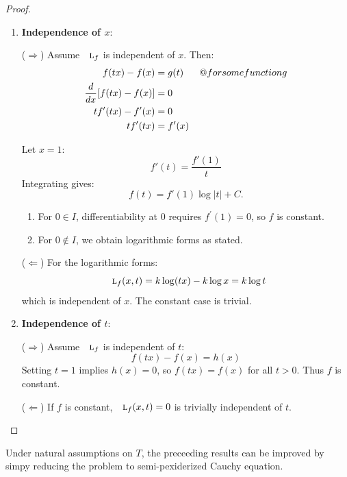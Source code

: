 \documentclass{amsart}
\makeatletter
\theoremstyle{plain}
\numberwithin{equation}{section}
\def\RIfM@{\relax\ifmmode}%
\def\RIfM@{\relax\protect\ifmmode}
\def\text{\RIfM@\expandafter\text@\else\expandafter\mbox\fi}
\def\text@#1{\mathchoice
   {\textdef@\displaystyle\f@size{#1}}%
   {\textdef@\textstyle\tf@size{\firstchoice@false #1}}%
   {\textdef@\textstyle\sf@size{\firstchoice@false #1}}%
   {\textdef@\textstyle \ssf@size{\firstchoice@false #1}}%
   \glb@settings}
\def\textdef@#1#2#3{\hbox{{%
                    \everymath{#1}%
                    \let\f@size#2\selectfont
                    #3}}}
\newif\iffirstchoice@
\makeatother
\begin{document}
\begin{proof}
\begin{enumerate}
    \item \textbf{Independence of $x$}:
    
    ($\Rightarrow$) Assume $\textsc{l}_f$ is independent of $x$. Then:
    \begin{align*}
        f(tx) - f(x) &= g(t) \quad \text{for some function } g \\
        \frac{d}{dx}[f(tx) - f(x)] &= 0 \\
        tf'(tx) - f'(x) &= 0 \\
        tf'(tx) &= f'(x)
    \end{align*}
    
    Let $x = 1$:
    \[
    f'(t) = \frac{f'(1)}{t}
    \]
    Integrating gives:
    \[
    f(t) = f'(1)\log|t| + C.
    \]
    
    \begin{enumerate}
        \item For $0 \in I$, differentiability at $0$ requires $f^\prime (1) = 0$, so $f$ is constant.
        \item For $0 \notin I$, we obtain logarithmic forms as stated.
    \end{enumerate}
    
    ($\Leftarrow$) For the logarithmic forms:
    \[
    \textsc{l}_f(x,t) = k\log(tx) - k\log x = k\log t
    \]
    which is independent of $x$. The constant case is trivial.
    
    \item \textbf{Independence of $t$}:
    
    ($\Rightarrow$) Assume $\textsc{l}_f$ is independent of $t$:
    \[
    f(tx) - f(x) = h(x)
    \]
    Setting $t = 1$ implies $h(x) = 0$, so $f(tx) = f(x)$ for all $t > 0$. Thus $f$ is constant.
    
    ($\Leftarrow$) If $f$ is constant, $\textsc{l}_f(x,t) = 0$ is trivially independent of $t$.
\end{enumerate}
\end{proof}

Under natural assumptions on $T$,
the preceeding results can be improved by simpy reducing 
the problem to semi-pexiderized Cauchy equation.
\end{document}
